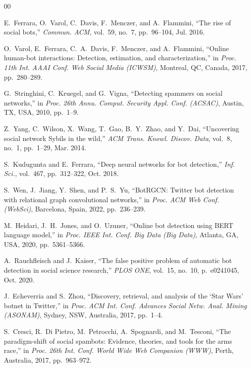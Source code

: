 \documentclass[conference]{IEEEtran}
\begin{document}
\begin{thebibliography}{00}

E.~Ferrara, O.~Varol, C.~Davis, F.~Menczer, and A.~Flammini,
``The rise of social bots,''
\textit{Commun. ACM}, vol.~59, no.~7, pp.~96--104, Jul. 2016.

O.~Varol, E.~Ferrara, C.~A.~Davis, F.~Menczer, and A.~Flammini,
``Online human-bot interactions: Detection, estimation, and characterization,''
in \textit{Proc. 11th Int. AAAI Conf. Web Social Media (ICWSM)},
Montreal, QC, Canada, 2017, pp.~280--289.

G.~Stringhini, C.~Kruegel, and G.~Vigna,
``Detecting spammers on social networks,''
in \textit{Proc. 26th Annu. Comput. Security Appl. Conf. (ACSAC)},
Austin, TX, USA, 2010, pp.~1--9.

Z.~Yang, C.~Wilson, X.~Wang, T.~Gao, B.~Y.~Zhao, and Y.~Dai,
``Uncovering social network Sybils in the wild,''
\textit{ACM Trans. Knowl. Discov. Data}, vol.~8, no.~1, pp.~1--29, Mar. 2014.

S.~Kudugunta and E.~Ferrara,
``Deep neural networks for bot detection,''
\textit{Inf. Sci.}, vol.~467, pp.~312--322, Oct. 2018.

S.~Wen, J.~Jiang, Y.~Shen, and P.~S.~Yu,
``BotRGCN: Twitter bot detection with relational graph convolutional networks,''
in \textit{Proc. ACM Web Conf. (WebSci)},
Barcelona, Spain, 2022, pp.~236--239.

M.~Heidari, J.~H.~Jones, and O.~Uzuner,
``Online bot detection using BERT language model,''
in \textit{Proc. IEEE Int. Conf. Big Data (Big Data)},
Atlanta, GA, USA, 2020, pp.~5361--5366.

A.~Rauchfleisch and J.~Kaiser,
``The false positive problem of automatic bot detection in social science
research,''
\textit{PLOS ONE}, vol.~15, no.~10, p.~e0241045, Oct. 2020.

J.~Echeverria and S.~Zhou,
``Discovery, retrieval, and analysis of the `Star Wars' botnet in Twitter,''
in \textit{Proc. ACM Int. Conf. Advances Social Netw. Anal. Mining (ASONAM)},
Sydney, NSW, Australia, 2017, pp.~1--4.

S.~Cresci, R.~Di Pietro, M.~Petrocchi, A.~Spognardi, and M.~Tesconi,
``The paradigm-shift of social spambots: Evidence, theories, and tools
for the arms race,''
in \textit{Proc. 26th Int. Conf. World Wide Web Companion (WWW)},
Perth, Australia, 2017, pp.~963--972.


\end{thebibliography}
\end{document}
